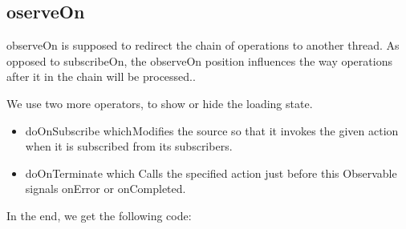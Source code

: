 \subsection{oserveOn}
observeOn is supposed to redirect the chain of operations to another thread. As opposed to subscribeOn, the observeOn position influences the way operations after it in the chain will be processed..

We use two more operators, to show or hide the loading state. 
\begin{itemize}
	\item doOnSubscribe which Modifies the source so that it invokes the given action when it is subscribed from its subscribers.
	\item  doOnTerminate which Calls the specified action just before this Observable signals onError or onCompleted.
\end{itemize}

In the end, we get the following code:






